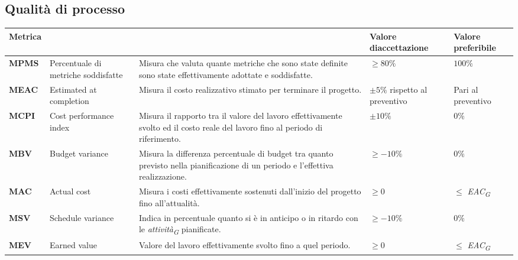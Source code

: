 \subsection{Qualità di processo}

\begin{longtable}{|C{1.9cm}|L{4cm}|L{4cm}|L{2.2cm}|L{2.1cm}|}
\hline
\textbf{Metrica} &  &  & \textbf{Valore di\linebreak accettazione} & {\textbf{Valore \linebreak preferibile}} \\
\hline \hline

\textbf{MPMS} & Percentuale di metriche soddisfatte & Misura che valuta quante metriche che sono state definite sono state effettivamente adottate e soddisfatte. & $\geq 80\%$ & $100\%$ \\
\hline

\textbf{MEAC} & Estimated at completion &  Misura il costo realizzativo stimato per terminare il progetto.  & $\pm 5\%$ rispetto al preventivo& Pari al preventivo \\
\hline

\textbf{MCPI} & Cost performance index & Misura il rapporto tra il valore del lavoro effettivamente svolto ed il costo reale del lavoro fino al periodo di riferimento. & $\pm 10\%$ & $0\%$ \\
\hline

\textbf{MBV} & Budget variance & Misura la differenza percentuale di budget tra quanto previsto nella pianificazione di un periodo e l’effettiva realizzazione. & $\geq -10\%$ & $0\%$ \\
\hline

\textbf{MAC} & Actual cost & Misura i costi effettivamente sostenuti dall’inizio del progetto fino all’attualità. & $\geq 0 $ & $ \leq$ \textit{EAC}\textsubscript{\textit{G}}  \\
\hline

\textbf{MSV} & Schedule variance & Indica in percentuale quanto si è in anticipo o in ritardo con le \textit{attività}\textsubscript{\textit{G}} pianificate. & $\geq -10\%$ & $0\%$ \\
\hline

\textbf{MEV} & Earned value & Valore del lavoro effettivamente svolto fino a quel periodo. & $\geq 0 $ & $\leq$ \textit{EAC}\textsubscript{\textit{G}} \\
\hline


\end{longtable}
